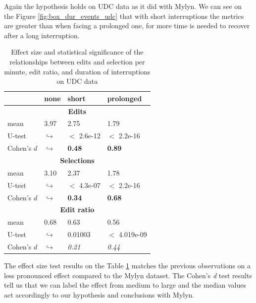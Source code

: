 \documentclass[times]{smrauth}
\begin{document}
Again the hypothesis holds on UDC data as it did with Mylyn. We can see on the Figure \ref{fig:box_dur_events_udc} that with short interruptions the metrics are greater than when facing a prolonged one, for more time is needed to recover after a long interruption. 
\begin{table}[ht!]
\renewcommand{\arraystretch}{1.3}
\caption{Effect size and statistical significance of the relationships between edits and selection per minute, edit ratio, and duration of interruptions on UDC data} %
\label{tbl:p_value2_udc}
\centering
\begin{tabular}{l | p{0.7cm} | p{1.9cm} | p{1.9cm} } 
   & none & short &  prolonged  \\  
  \hline
  \multicolumn{4}{c}{\textbf{Edits}} \\
  \hline
  mean & 3.97 &	2.75 & 1.79 \\ 
   \cline{3-4} 
  U-test & $\hookrightarrow$ &  $<$ 2.6e-12 & $<$ 2.2e-16  \\

  \cline{3-4} 
  Cohen's $d$ & $\hookrightarrow$	& \textbf{0.48} & \textbf{0.89}   \\
  \hline
  
  
  \multicolumn{4}{c}{\textbf{Selections}} \\
  \hline 
  mean & 3.10 &	2.37 & 1.78 \\ 
   \cline{3-4} 
  U-test & $\hookrightarrow$ & $<$ 4.3e-07& $<$ 2.2e-16  \\
  
  \cline{3-4} 
  Cohen's $d$ & $\hookrightarrow$	& \textbf{0.34} & \textbf{0.68}  \\  
  \hline
  \multicolumn{4}{c}{\textbf{Edit ratio}} \\
  \hline 
  mean & 0.68 & 0.63 & 0.56\\ 
   \cline{3-4} 
  U-test & $\hookrightarrow$ & 0.01003 & $<$ 4.019e-09  \\
  \cline{3-4} 
  Cohen's $d$ & $\hookrightarrow$ & \textit{0.21} & \textit{0.44}\\
\hline

\end{tabular}
\end{table}
The effect size test results on the Table \ref{tbl:p_value2_udc} matches the previous observations on a less pronounced effect compared to the Mylyn dataset. The Cohen's \textit{d} test results tell us that we can label the effect from medium to large and the median values act accordingly to our hypothesis and conclusions with Mylyn.
\end{document}
